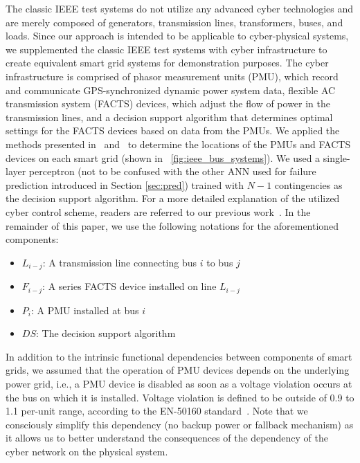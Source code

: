 \documentclass[12pt]{elsarticle}
\begin{document}
The classic IEEE test systems do not utilize any advanced cyber technologies and are merely composed of generators, transmission lines, transformers, buses, and loads. Since our approach is intended to be applicable to cyber-physical systems, we supplemented the classic IEEE test systems with cyber infrastructure to create equivalent smart grid systems for demonstration purposes. The cyber infrastructure is comprised of phasor measurement units (PMU), which record and communicate GPS-synchronized dynamic power system data, flexible AC transmission system (FACTS) devices, which adjust the flow of power in the transmission lines, and a decision support algorithm that determines optimal settings for the FACTS devices based on data from the PMUs. We applied the methods presented in~\cite{AsK11} and~\cite{AcM07} to determine the locations of the PMUs and FACTS devices on each smart grid (shown in \figurename~\ref{fig:ieee_bus_systems}). We used a single-layer perceptron (not to be confused with the other ANN used for failure prediction introduced in Section \ref{sec:pred}) trained with $N-1$ contingencies as the decision support algorithm. For a more detailed explanation of the utilized cyber control scheme, readers are referred to our previous work~\cite{MaS14,MaS18}. In the remainder of this paper, we use the following notations for the aforementioned components:

\begin{itemize}
  \item $L_{i-j}$: A transmission line connecting bus $i$ to bus $j$
  \item $F_{i-j}$: A series FACTS device installed on line $L_{i-j}$
  \item $P_i$: A PMU installed at bus $i$
  \item $DS$: The decision support algorithm
\end{itemize}

In addition to the intrinsic functional dependencies between components of smart grids, we assumed that the operation of PMU devices depends on the underlying power grid, i.e., a PMU device is disabled as soon as a voltage violation occurs at the bus on which it is installed. Voltage violation is defined to be outside of 0.9 to 1.1 per-unit range, according to the EN-50160 standard~\cite{EN50160}. Note that we consciously simplify this dependency (no backup power or fallback mechanism) as it allows us to better understand the consequences of the dependency of the cyber network on the physical system.
\end{document}
